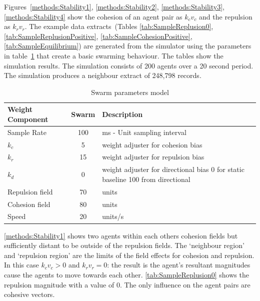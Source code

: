 Figures~\ref{methods:Stability1}, \ref{methods:Stability2}, \ref{methods:Stability3}, \ref{methods:Stability4} show the cohesion of an agent pair as $k_cv_c$ and the repulsion as $k_rv_r$. The example data extracts~(Tables \ref{tab:SampleReplusion0}, \ref{tab:SampleReplusionPositive}, \ref{tab:SampleCohesionPositive}, \ref{tab:SampleEquilibrium}) are generated from the simulator using the parameters in table~\ref{tab:MetricPhysics1} that create a basic swarming behaviour. The tables show the simulation results. The simulation consists of 200 agents over a 20 second period. The simulation produces a neighbour extract of 248,798 records.

\begin{table}[H]
\begin{center}
\begin{tabular}{| p{2.5cm} | c | p{7cm} |}
\hline
\bf Weight \bf Component & \bf Swarm & \bf Description \\ \hline
Sample Rate & 100 & ms - Unit sampling interval\\  \hline
$k_c$ & 5 & weight adjuster for cohesion bias\\  \hline
$k_r$ & 15 & weight adjuster for repulsion  bias\\  \hline
$k_d$ & 0 & weight adjuster for directional bias 0 for static baseline 100 from directional\\  \hline
Repulsion field & 70 & units\\  \hline
Cohesion field & 80 & units\\  \hline
Speed & 20 & units/s\\  \hline
\end{tabular}\caption{Swarm parameters model} \label{tab:MetricPhysics1}
\end{center}
\end{table}

\autoref{methods:Stability1} shows two agents within each others cohesion fields but sufficiently distant to be outside of the repulsion fields. The `neighbour region' and `repulsion region' are the limits of the field effects for cohesion and repulsion. In this case $k_cv_c > 0$ and $k_rv_r = 0$: the result is the agent's resultant magnitudes cause the agents to move towards each other. \autoref{tab:SampleReplusion0} shows the repulsion magnitude with a value of 0. The only influence on the agent pairs are cohesive vectors. 

